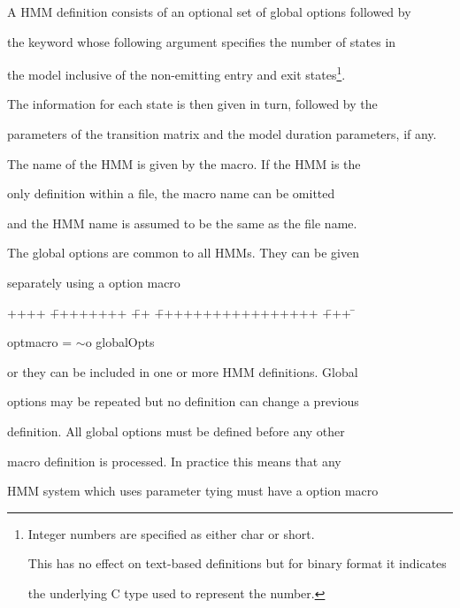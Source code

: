 A HMM definition consists of an optional set of global options followed by


the  keyword whose following argument specifies the number of states in 


the model inclusive of the non-emitting entry and exit states\footnote{


Integer numbers are specified as either \textsf{char} or \textsf{short}.


This has no effect on text-based definitions but for binary format it indicates


the underlying C type used to represent the number.}.


The information for each state is then given in turn, followed by the 


parameters of the transition matrix and the model duration parameters, if any.


The name of the HMM is given by the  macro.  If the HMM is the


only definition within a file, the  macro name can be omitted


and the HMM name is assumed to be the same as the file name.





The global options are common to all HMMs.  They can be given 


separately using a  option macro 


{\sf


\begin{tabbing}


++++ \= ++++++++ \= ++ \= +++++++++++++++++ \= +++ \=  \kill


\> optmacro = \> $\sim$o globalOpts 


\end{tabbing}


}


\noindent


or they can be included in one or more HMM definitions.  Global


options may be repeated but no definition can change a previous


definition.  All global options must be defined before any other


macro definition is processed.  In practice this means that any


HMM system which uses parameter tying must have a  option macro 


